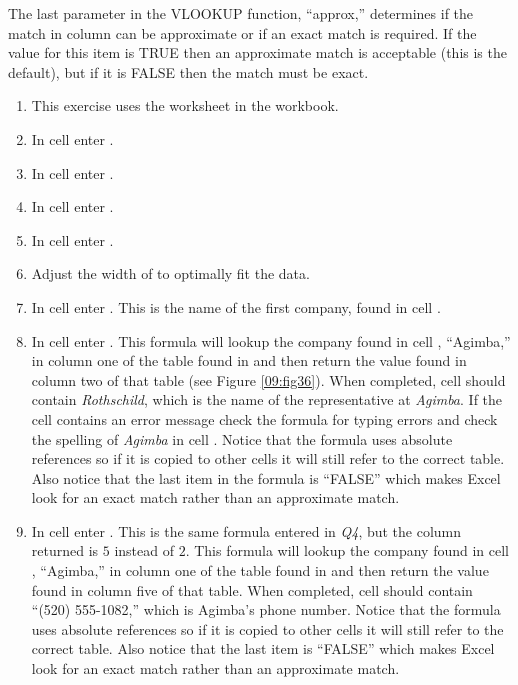 The last parameter in the VLOOKUP function, ``approx,'' determines if the match in column can be approximate or if an exact match is required. If the value for this item is TRUE then an approximate match is acceptable (this is the default), but if it is FALSE then the match must be exact. 

\begin{enumbox}
	\begin{enumerate}
		\item This exercise uses the  worksheet in the  workbook.
		\item In cell  enter .
		\item In cell  enter .
		\item In cell  enter .
		\item In cell  enter .
		\item Adjust the width of  to optimally fit the data.
		\item In cell  enter . This is the name of the first company, found in cell .
		\item In cell  enter . This formula will lookup the company found in cell , ``Agimba,'' in column one of the table found in  and then return the value found in column two of that table (see Figure \ref{09:fig36}). When completed, cell  should contain \textit{Rothschild}, which is the name of the representative at \textit{Agimba}. If the cell contains an error message check the formula for typing errors and check the spelling of \textit{Agimba} in cell . Notice that the formula uses absolute references so if it is copied to other cells it will still refer to the correct table. Also notice that the last item in the formula is ``FALSE'' which makes Excel look for an exact match rather than an approximate match.
		\item In cell  enter . This is the same formula entered in \textit{Q4}, but the column returned is $ 5 $ instead of $ 2 $. This formula will lookup the company found in cell , ``Agimba,'' in column one of the table found in  and then return the value found in column five of that table. When completed, cell  should contain ``(520) 555-1082,'' which is Agimba's phone number.  Notice that the formula uses absolute references so if it is copied to other cells it will still refer to the correct table. Also notice that the last item is ``FALSE'' which makes Excel look for an exact match rather than an approximate match.

\end{enumerate}
\end{enumbox}

